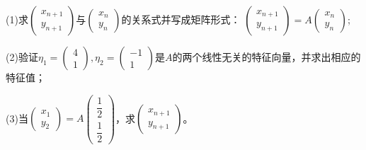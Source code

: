 \documentclass[a4paper]{report}
\begin{document}
(1)求$
\begin{pmatrix}
x_{n+1}\\ y_{n+1}
\end{pmatrix}
$与$
\begin{pmatrix}
x_n\\ y_n
\end{pmatrix}
$的关系式并写成矩阵形式：
$
\begin{pmatrix}
x_{n+1}\\ y_{n+1}
\end{pmatrix}=A
\begin{pmatrix}
x_n\\ y_n
\end{pmatrix}
$;

(2)验证$\eta_1=
\begin{pmatrix}
4\\1
\end{pmatrix},\eta_2=
\begin{pmatrix}
-1\\1
\end{pmatrix}
$是$A$的两个线性无关的特征向量，并求出相应的特征值；

(3)当$
\begin{pmatrix}
x_{1}\\ y_{2}
\end{pmatrix}=A
\begin{pmatrix}
\dfrac{1}{2}\\[4pt] \dfrac{1}{2}
\end{pmatrix}
$，求$
\begin{pmatrix}
x_{n+1}\\ y_{n+1}
\end{pmatrix}
$。
\end{document}
